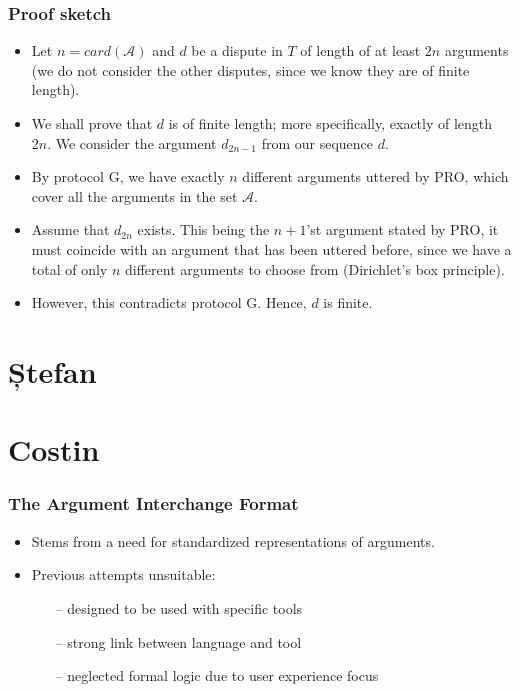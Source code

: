 \documentclass{beamer}
\begin{document}
\begin{frame}
	\frametitle{Proof sketch}
	\begin{itemize}
		\item Let $n = card(\mathcal{A})$ and $d$ be a dispute in $T$ of length of at least $2n$ arguments (we do not consider the other disputes, since we know they are of finite length).\pause
		\item We shall prove that $d$ is of finite length; more specifically, exactly of length $2n$. We consider the argument $d_{2n - 1}$ from our sequence $d$.\pause
		\item By protocol G, we have exactly $n$ different arguments uttered by PRO, which cover all the arguments in the set $\mathcal{A}$. \pause
		\item Assume that $d_{2n}$ exists. This being the $n+1$'st argument stated by PRO, it must coincide with an argument that has been uttered before, since we have a total of only $n$ different arguments to choose from (Dirichlet's box principle). \pause
		\item However, this contradicts protocol G. Hence, $d$ is finite.
	\end{itemize}
\end{frame}
\section{Ștefan}

\section{Costin}
\begin{frame}
\frametitle{The Argument Interchange Format}
\begin{itemize}
\item Stems from a need for standardized representations of arguments. \pause
\item Previous attempts unsuitable: \pause
  \begin{itemize}
  \item[--] designed to be used with specific tools \pause
  \item[--] strong link between language and tool \pause
  \item[--] neglected formal logic due to user experience focus
  \end{itemize}
\end{itemize}
\end{frame}
\end{document}
